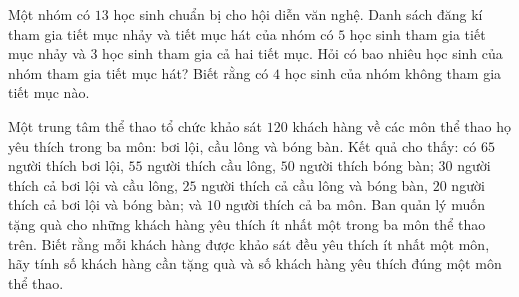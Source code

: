 \begin{bt}%
	Một nhóm có $ 13 $ học sinh chuẩn bị cho hội diễn văn nghệ. Danh sách đăng kí tham gia tiết mục nhảy và tiết mục hát của nhóm có $ 5 $ học sinh tham gia tiết mục nhảy và $ 3 $ học sinh tham gia cả hai tiết mục. Hỏi có bao nhiêu học sinh của nhóm tham gia tiết mục hát? Biết rằng có $ 4  $ học sinh của nhóm không tham gia tiết mục nào.
	
\end{bt}

\begin{bt}%
	Một trung tâm thể thao tổ chức khảo sát $120$ khách hàng về các môn thể thao họ yêu thích trong ba môn: bơi lội, cầu lông và bóng bàn. Kết quả cho thấy: có $65$ người thích bơi lội, $55$ người thích cầu lông, $50$ người thích bóng bàn; $30$ người thích cả bơi lội và cầu lông, $25$ người thích cả cầu lông và bóng bàn, $20$ người thích cả bơi lội và bóng bàn; và $10$ người thích cả ba môn. Ban quản lý muốn tặng quà cho những khách hàng yêu thích ít nhất một trong ba môn thể thao trên. Biết rằng mỗi khách hàng được khảo sát đều yêu thích ít nhất một môn, hãy tính số khách hàng cần tặng quà và số khách hàng yêu thích đúng một môn thể thao.
	
\end{bt}

